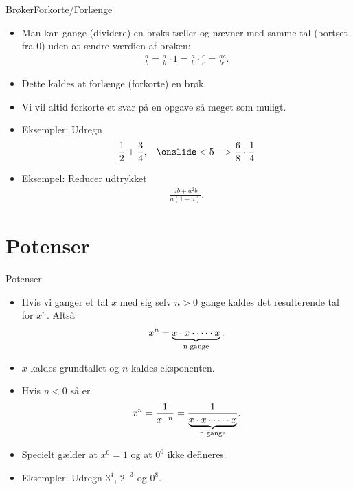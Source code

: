 \begin{frame}{Brøker}{Forkorte/Forlænge}
\begin{itemize}
		\setlength\itemsep{1em}
	\item<1-> Man kan gange (dividere) en brøks tæller og nævner med samme tal (bortset fra 0) uden at ændre værdien af brøken:
	\begin{align*}
	\frac{a}{b}=\frac{a}{b}\cdot1=\frac{a}{b}\cdot \frac{c}{c}=\frac{ac}{bc}.
	\end{align*}
	\item<2-> Dette kaldes at forlænge (forkorte) en brøk. 
	\item<3-> Vi vil altid forkorte et svar på en opgave så meget som muligt.
	\item<4-> Eksempler: Udregn
	\begin{align*}
	\frac{1}{2}+\frac{3}{4},&& \onslide<5->{\frac{6}{8}\cdot\frac{1}{4}}
	\end{align*}
	\item<6-> Eksempel: Reducer udtrykket
	\begin{align*}
	\frac{ab+a^2b}{a(1+a)}.
	\end{align*}
\end{itemize}
\end{frame}



\section{Potenser}
\begin{frame}{Potenser}
\begin{itemize}
		\setlength\itemsep{1em}
	\item<1-> Hvis vi ganger et tal $x$ med sig selv $n> 0$ gange kaldes det resulterende tal for $x^n$. Altså
	\begin{align*}
	x^n=\underbrace{x \cdot x \cdot \dots \cdot x}_{\textup{n gange}}.
	\end{align*}
	\item<2-> $x$ kaldes grundtallet og $n$ kaldes eksponenten.
	\item<3-> Hvis $n<0$ så er
	\begin{align*}
	x^n=\frac{1}{x^{-n}}=\frac{1}{\underbrace{x \cdot x \cdot \dots \cdot x}_{\textup{n gange}}}.
	\end{align*}
	\item<4-> Specielt gælder at $x^0=1$ og at $0^0$ ikke defineres.
	\item<5-> Eksempler: Udregn $3^4$, $2^{-3}$ og $0^8$.
\end{itemize}
\end{frame}

